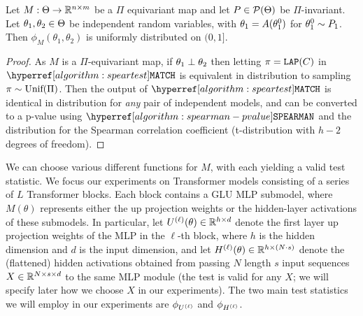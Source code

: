 \begin{theorem}
Let $M: \Theta \to \mathbb{R}^{n \times m}$ be a $\Pi$ equivariant map and let $P \in \mathcal{P}(\Theta)$ be $\Pi$-invariant. Let $\theta_1,\theta_2 \in \Theta$ be independent random variables, with $\theta_1 = A(\theta_1^0)$ for $\theta_1^0 \sim P_1$. Then $\phi_M(\theta_1,\theta_2)$ is uniformly distributed on $(0,1]$.
\end{theorem}
\begin{proof}
    As $M$ is a $\Pi$-equivariant map, if $\theta_1 \perp \theta_2$ then letting $\pi = \mathtt{LAP}(C)$ in $\speartest$ is equivalent in distribution to sampling $\pi \sim \textup{Unif}(\Pi)$. Then the output of $\speartest$ is identical in distribution for \textit{any} pair of independent models, and can be converted to a p-value using $\spearman$ and the distribution for the Spearman correlation coefficient (t-distribution with $h-2$ degrees of freedom).
\end{proof}

We can choose various different functions for $M$, with each yielding a valid test statistic.
We focus our experiments on Transformer models consisting of a series of $L$ Transformer blocks. Each block contains a GLU MLP submodel, where $M(\theta)$ represents either the  up projection weights or the hidden-layer activations of these submodels.
In particular, let $U^{(\ell)}(\theta) \in \mathbb{R}^{h \times d}$ denote the first layer up projection weights of the MLP in the $\ell$-th block, where $h$ is the hidden dimension and $d$ is the input dimension, and let $H^{(\ell)}(\theta) \in \mathbb{R}^{h \times (N \cdot s)}$ denote the (flattened) hidden activations obtained from passing $N$ length $s$ input sequences $X \in \mathbb{R}^{N \times s \times d}$ to the same MLP module (the test is valid for any $X$; we will specify later how we choose $X$ in our experiments). 
The two main test statistics we will employ in our experiments are $\phi_{U^{(\ell)}}$ and $\phi_{H^{(\ell)}}$.

